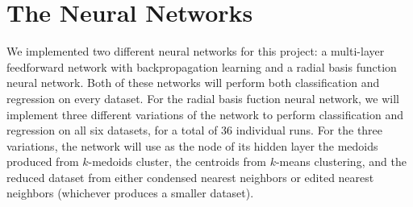 \documentclass[twoside,11pt]{article}
\begin{document}


\section{The Neural Networks}
We implemented two different neural networks for this project: a multi-layer feedforward network with backpropagation learning and a radial basis function neural network. Both of these networks will perform both classification and regression on every dataset. For the radial basis fuction neural network, we will implement three different variations of the network to perform classification and regression on all six datasets, for a total of 36 individual runs. For the three variations, the network will use as the node of its hidden layer the medoids produced from $k$-medoids cluster, the centroids from $k$-means clustering, and the reduced dataset from either condensed nearest neighbors or edited nearest neighbors (whichever produces a smaller dataset).

\end{document}
